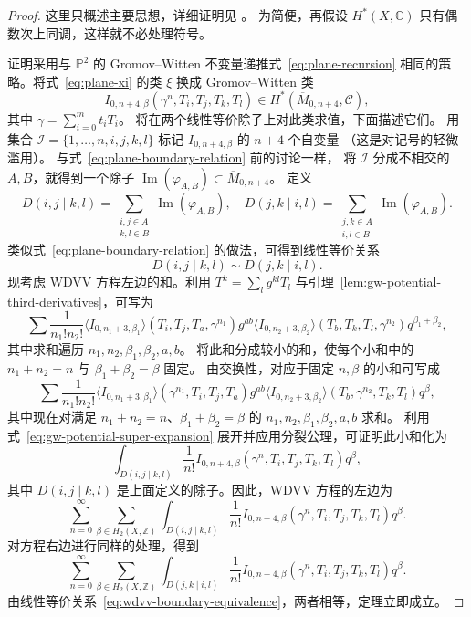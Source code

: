 \begin{proof}
这里只概述主要思想，详细证明见 。
为简便，再假设 $H^*(X,\mathbb C)$ 只有偶数次上同调，这样就不必处理符号。

证明采用与 $\mathbb P^2$ 的 Gromov--Witten 不变量递推式~\eqref{eq:plane-recursion}
相同的策略。将式~\eqref{eq:plane-xi} 的类 $\xi$ 换成 Gromov--Witten 类
\[
I_{0,n+4,\beta}(\gamma^n,T_i,T_j,T_k,T_l)\in H^*(\overline M_{0,n+4},\mathcal C),
\]
其中 $\gamma=\sum_{i=0}^mt_iT_i$。
将在两个线性等价除子上对此类求值，下面描述它们。
用集合 $\mathcal I=\{1,\ldots,n,i,j,k,l\}$ 标记 $I_{0,n+4,\beta}$ 的 $n+4$ 个自变量
（这是对记号的轻微滥用）。
与式~\eqref{eq:plane-boundary-relation} 前的讨论一样，
将 $\mathcal I$ 分成不相交的 $A,B$，就得到一个除子
$\operatorname{Im}(\varphi_{A,B})\subset\overline M_{0,n+4}$。
定义
\[
D(i,j\mid k,l)=\sum_{\substack{i,j\in A\\k,l\in B}}\operatorname{Im}(\varphi_{A,B}),
\quad
D(j,k\mid i,l)=\sum_{\substack{j,k\in A\\i,l\in B}}\operatorname{Im}(\varphi_{A,B}).
\]
类似式~\eqref{eq:plane-boundary-relation} 的做法，可得到线性等价关系
\begin{equation}\label{eq:wdvv-boundary-equivalence}
D(i,j\mid k,l)\sim D(j,k\mid i,l).
\end{equation}
现考虑 WDVV 方程左边的和。利用 $T^k=\sum_lg^{kl}T_l$ 与引理~\ref{lem:gw-potential-third-derivatives}，可写为
\[
\sum\frac1{n_1!n_2!}\langle I_{0,n_1+3,\beta_1}\rangle(T_i,T_j,T_a,\gamma^{n_1})
g^{ab}\langle I_{0,n_2+3,\beta_2}\rangle(T_b,T_k,T_l,\gamma^{n_2})q^{\beta_1+\beta_2},
\]
其中求和遍历 $n_1,n_2,\beta_1,\beta_2,a,b$。
将此和分成较小的和，使每个小和中的 $n_1+n_2=n$ 与 $\beta_1+\beta_2=\beta$ 固定。
由交换性，对应于固定 $n,\beta$ 的小和可写成
\[
\sum\frac1{n_1!n_2!}\langle I_{0,n_1+3,\beta_1}\rangle(\gamma^{n_1},T_i,T_j,T_a)
g^{ab}\langle I_{0,n_2+3,\beta_2}\rangle(T_b,\gamma^{n_2},T_k,T_l)q^\beta,
\]
其中现在对满足 $n_1+n_2=n$、$\beta_1+\beta_2=\beta$ 的 $n_1,n_2,\beta_1,\beta_2,a,b$ 求和。
利用式~\eqref{eq:gw-potential-super-expansion} 展开并应用分裂公理，可证明此小和化为
\[
\int_{D(i,j\mid k,l)}\frac1{n!}I_{0,n+4,\beta}(\gamma^n,T_i,T_j,T_k,T_l)q^\beta,
\]
其中 $D(i,j\mid k,l)$ 是上面定义的除子。因此，WDVV 方程的左边为
\[
\sum_{n=0}^{\infty}\sum_{\beta\in H_2(X,\mathbb Z)}
\int_{D(i,j\mid k,l)}\frac1{n!}I_{0,n+4,\beta}(\gamma^n,T_i,T_j,T_k,T_l)q^\beta.
\]
对方程右边进行同样的处理，得到
\[
\sum_{n=0}^{\infty}\sum_{\beta\in H_2(X,\mathbb Z)}
\int_{D(j,k\mid i,l)}\frac1{n!}I_{0,n+4,\beta}(\gamma^n,T_i,T_j,T_k,T_l)q^\beta.
\]
由线性等价关系~\eqref{eq:wdvv-boundary-equivalence}，两者相等，定理立即成立。
\end{proof}
